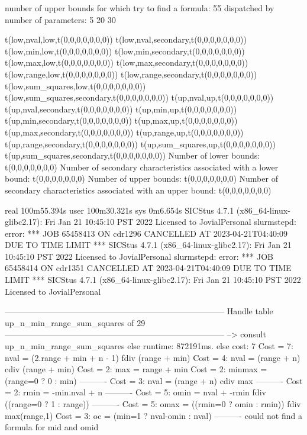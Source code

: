 number of upper bounds for which try to find a formula: 55
dispatched by number of parameters: 5  20  30

t(low,nval,low,t(0,0,0,0,0,0,0))
t(low,nval,secondary,t(0,0,0,0,0,0,0))
t(low,min,low,t(0,0,0,0,0,0,0))
t(low,min,secondary,t(0,0,0,0,0,0,0))
t(low,max,low,t(0,0,0,0,0,0,0))
t(low,max,secondary,t(0,0,0,0,0,0,0))
t(low,range,low,t(0,0,0,0,0,0,0))
t(low,range,secondary,t(0,0,0,0,0,0,0))
t(low,sum_squares,low,t(0,0,0,0,0,0,0))
t(low,sum_squares,secondary,t(0,0,0,0,0,0,0))
t(up,nval,up,t(0,0,0,0,0,0,0))
t(up,nval,secondary,t(0,0,0,0,0,0,0))
t(up,min,up,t(0,0,0,0,0,0,0))
t(up,min,secondary,t(0,0,0,0,0,0,0))
t(up,max,up,t(0,0,0,0,0,0,0))
t(up,max,secondary,t(0,0,0,0,0,0,0))
t(up,range,up,t(0,0,0,0,0,0,0))
t(up,range,secondary,t(0,0,0,0,0,0,0))
t(up,sum_squares,up,t(0,0,0,0,0,0,0))
t(up,sum_squares,secondary,t(0,0,0,0,0,0,0))
Number of lower bounds:                                             t(0,0,0,0,0,0,0)
Number of secondary characteristics associated with a lower bound:  t(0,0,0,0,0,0,0)
Number of upper bounds:                                             t(0,0,0,0,0,0,0)
Number of secondary characteristics associated with an upper bound: t(0,0,0,0,0,0,0)

real	100m55.394s
user	100m30.321s
sys	0m6.654s
SICStus 4.7.1 (x86_64-linux-glibc2.17): Fri Jan 21 10:45:10 PST 2022
Licensed to JovialPersonal
slurmstepd: error: *** JOB 65458413 ON cdr1296 CANCELLED AT 2023-04-21T04:40:09 DUE TO TIME LIMIT ***
SICStus 4.7.1 (x86_64-linux-glibc2.17): Fri Jan 21 10:45:10 PST 2022
Licensed to JovialPersonal
slurmstepd: error: *** JOB 65458414 ON cdr1351 CANCELLED AT 2023-04-21T04:40:09 DUE TO TIME LIMIT ***
SICStus 4.7.1 (x86_64-linux-glibc2.17): Fri Jan 21 10:45:10 PST 2022
Licensed to JovialPersonal


--------------------------------------------------------------------------------
Handle table up_n_min_range_sum_squares of 29
--------------------------------------------------------------------------------
--> consult up_n_min_range_sum_squares
else runtime: 872191ms. else cost: 7
Cost =  7:  nval   = (2.range + min + n - 1) fdiv (range + min) %
Cost =  4:  nval   = (range + n) cdiv (range + min)
Cost =  2:  max    = range + min
Cost =  2:  minmax = (range=0 ? 0 : min)
----------
Cost =  3:  nval   = (range + n) cdiv max
----------
Cost =  2:  rmin   = -min.nval + n
----------
Cost =  5:  omin   = nval + -rmin fdiv ((range=0 ? 1 : range)) %
----------
Cost =  5:  omax   = ((rmin=0 ? omin : rmin)) fdiv max(range,1) %
Cost =  3:  oc     = (min=1 ? nval-omin : nval)
----------
could not find a formula for mid and omid

